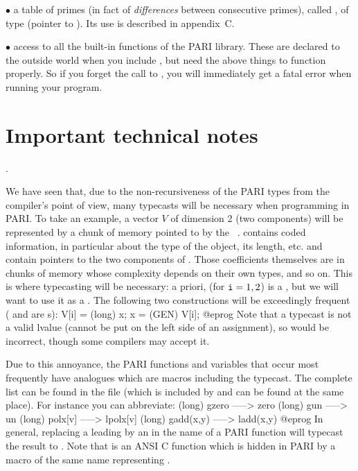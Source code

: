 $\bullet$ a table of primes (in fact of \emph{differences} between
consecutive primes), called , of type 
(pointer to ). Its use is described in appendix~C.

$\bullet$ access to all the built-in functions of the PARI library.
These are declared to the outside world when you include , but
need the above things to function properly. So if you forget the call to
, you will immediately get a fatal error when running your
program.

\section{Important technical notes}

.\label{se:typecast}

\noindent
We have seen that, due to the non-recursiveness of the PARI types from the
compiler's point of view, many typecasts will be necessary when programming
in PARI. To take an example, a vector $V$ of dimension 2 (two components)
will be represented by a chunk of memory pointed to by the ~.
 contains coded information, in particular about the type of the
object, its length, etc.  and  contain pointers to
the two components of . Those coefficients  themselves are in
chunks of memory whose complexity depends on their own types, and so on. This
is where typecasting will be necessary: a priori,  (for
${\tt i}=1,2$) is a , but we will want to use it as a .
The following two constructions will be exceedingly frequent ( and
 are s):
%
\bprog
  V[i] = (long) x;
  x = (GEN) V[i];
@eprog
\noindent Note that a typecast is not a valid lvalue (cannot be put on the
left side of an assignment), so  would be incorrect, though
some compilers may accept it.

Due to this annoyance, the PARI functions and variables that occur most
frequently have analogues which are macros including the typecast. The complete
list can be found in the file  (which is included by
 and can be found at the same place). For instance you can
abbreviate:
%
\bprog
(long) gzero     ----->  zero
(long) gun       ----->  un
(long) polx[v]   ----->  lpolx[v]
(long) gadd(x,y) ----->  ladd(x,y)
@eprog\noindent%
%
%
In general, replacing a leading  by an  in the name of a PARI
function will typecast the result to . Note that  is an ANSI C
function which is hidden in PARI by a macro of the same name representing
.

